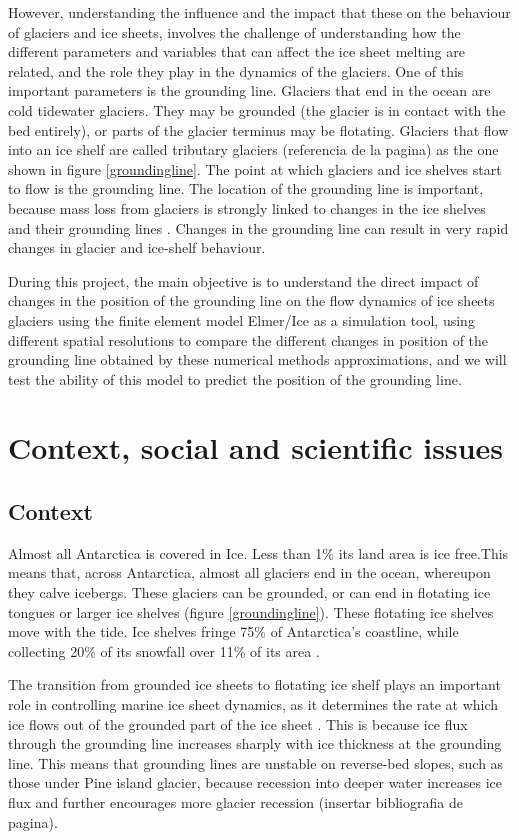 \documentclass[a4paper,12pt]{article}
\begin{document}
However, understanding the influence and the impact that these on the behaviour of glaciers and ice sheets, involves the challenge of understanding how the different parameters and variables that can affect the ice sheet melting are related, and the role they play in the dynamics of the glaciers. One of this important parameters is the grounding line. Glaciers that end in the ocean are cold tidewater glaciers. They may be grounded (the glacier is in contact with the bed entirely), or parts of the glacier terminus may be flotating. Glaciers that flow into an ice shelf are called tributary glaciers (referencia de la pagina) as the one shown in figure \ref{groundingline}. The point at which  glaciers and ice shelves start to flow is the grounding line. The location of the grounding line is important, because mass loss from glaciers is strongly linked to changes in the ice shelves and their grounding lines \cite[]{brunt2010mapping,pritchard2012antarctic}. Changes in the grounding line can result in very rapid changes in glacier and ice-shelf behaviour.

During this project, the main objective is to understand the direct impact of changes in the position of the grounding line on the flow dynamics of ice sheets glaciers using the finite element model Elmer/Ice as a simulation tool, using different spatial resolutions to compare the different changes in position of the grounding line obtained by these numerical methods approximations, and we will test the ability of this model to predict the position of the grounding line.
\section{Context, social and scientific issues}
\subsection{Context}

Almost all Antarctica is covered in Ice. Less than 1\% its land area is ice free.This means that, across Antarctica, almost all glaciers end in the ocean, whereupon they calve icebergs. These glaciers can be grounded, or can end in flotating ice tongues or larger ice shelves (figure \ref{groundingline}). These flotating ice shelves move with the tide. Ice shelves fringe 75\% of Antarctica's coastline, while collecting 20\% of its snowfall over 11\% of its area \cite[]{rignot2013ice}.

The transition from grounded ice sheets to flotating ice shelf plays an important role in controlling marine ice sheet dynamics, as it determines the rate at which ice flows out of the grounded part of the ice sheet \cite[]{schoof2007ice}. This is because ice flux through the grounding line increases sharply with ice thickness at the grounding line. This means that grounding lines are unstable on reverse-bed slopes, such as those under Pine island glacier, because recession into deeper water increases ice flux and further encourages more glacier recession (insertar bibliografia de pagina).
\end{document}
